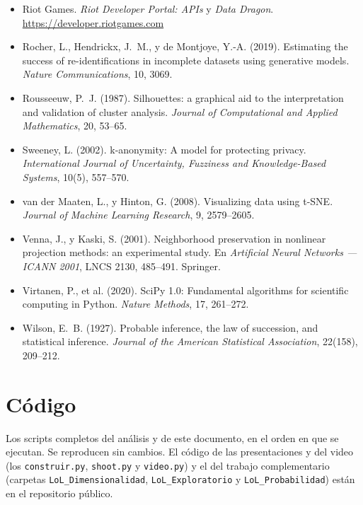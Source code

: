 \documentclass[11pt,letterpaper]{article}
\begin{document}
\begin{itemize}[leftmargin=1.4em,itemsep=.3em,label={}]
        \emph{Journal of Machine Learning Research}, 12, 2825--2830.
  \item Riot Games. \emph{Riot Developer Portal: APIs} y \emph{Data Dragon}.
        \url{https://developer.riotgames.com}
  \item Rocher, L., Hendrickx, J.~M., y de Montjoye, Y.-A. (2019). Estimating the
        success of re-identifications in incomplete datasets using generative models.
        \emph{Nature Communications}, 10, 3069.
  \item Rousseeuw, P.~J. (1987). Silhouettes: a graphical aid to the interpretation and
        validation of cluster analysis. \emph{Journal of Computational and Applied
        Mathematics}, 20, 53--65.
  \item Sweeney, L. (2002). k-anonymity: A model for protecting privacy.
        \emph{International Journal of Uncertainty, Fuzziness and Knowledge-Based
        Systems}, 10(5), 557--570.
  \item van der Maaten, L., y Hinton, G. (2008). Visualizing data using t-SNE.
        \emph{Journal of Machine Learning Research}, 9, 2579--2605.
  \item Venna, J., y Kaski, S. (2001). Neighborhood preservation in nonlinear projection
        methods: an experimental study. En \emph{Artificial Neural Networks — ICANN 2001},
        LNCS 2130, 485--491. Springer.
  \item Virtanen, P., et al. (2020). SciPy 1.0: Fundamental algorithms for scientific
        computing in Python. \emph{Nature Methods}, 17, 261--272.
  \item Wilson, E.~B. (1927). Probable inference, the law of succession, and
        statistical inference. \emph{Journal of the American Statistical
        Association}, 22(158), 209--212.
\end{itemize}

\vspace{.5cm}

\newpage
\appendix
\section{Código}
Los scripts completos del análisis y de este documento, en el orden en que se ejecutan.
Se reproducen sin cambios. El código de las presentaciones y del video (los
\texttt{construir.py}, \texttt{shoot.py} y \texttt{video.py}) y el del trabajo
complementario (carpetas \texttt{LoL\_Dimensionalidad}, \texttt{LoL\_Exploratorio} y
\texttt{LoL\_Probabilidad}) están en el repositorio público.
\end{document}
